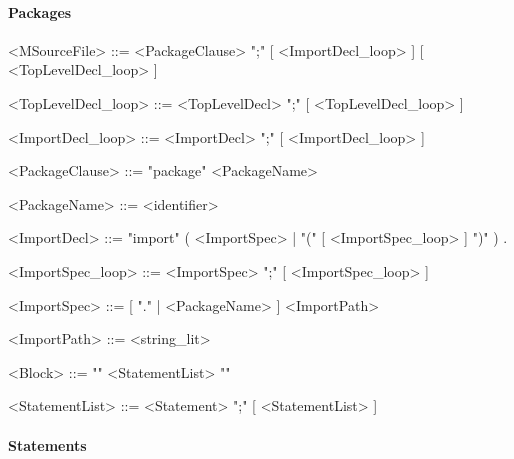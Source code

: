 \documentclass{article}
\begin{document}
    
    \setlength{\grammarparsep}{5pt plus 1pt minus 1pt} %
    \setlength{\grammarindent}{12em} %

    \paragraph{Packages}

    \begin{grammar}

        <MSourceFile>       ::=     <PackageClause> ";" [ <ImportDecl_loop> ] [ <TopLevelDecl_loop> ]
        
        <TopLevelDecl_loop> ::=     <TopLevelDecl> ";" [ <TopLevelDecl_loop> ]

        <ImportDecl_loop>   ::=     <ImportDecl> ";" [ <ImportDecl_loop> ]

        <PackageClause>     ::=     "package" <PackageName>

        <PackageName>       ::=     <identifier>

        <ImportDecl>        ::=     "import" ( <ImportSpec> | "(" [ <ImportSpec_loop> ] ")" ) .

        <ImportSpec_loop>   ::=     <ImportSpec> ";" [ <ImportSpec_loop> ]

        <ImportSpec>        ::=     [ "." | <PackageName> ] <ImportPath>

        <ImportPath>        ::=     <string_lit>



    \end{grammar}

    \begin{grammar}

        <Block>             ::=     "{" <StatementList> "}"

        <StatementList>     ::=     <Statement> ";" [ <StatementList> ]

    \end{grammar}

    \paragraph{Statements}
\end{document}
